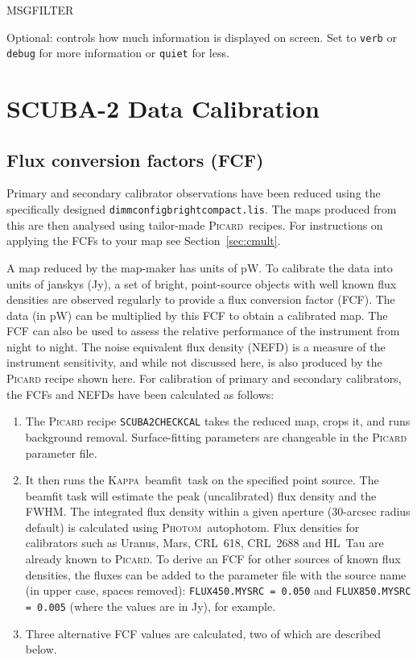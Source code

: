 \documentclass[twoside,11pt]{article}
\newcommand{\htmlref}[2]{#1}
\newcommand{\latexhtml}[2]{#1}
\newcommand{\xref}[3]{#1}
\newcommand{\xlabel}[1]{}
\renewcommand{\_}{\texttt{\symbol{95}}}
\newcommand{\Kappa}{\xref{\textsc{Kappa}}{sun95}{}}
\newcommand{\photom}{\xref{\textsc{Photom}}{sun45}{}}
\newcommand{\picard}{\xref{\textsc{Picard}}{sun265}{}}
\newcommand{\drrecipe}[1]{\texttt{#1}}
\newcommand{\task}[1]{\textsf{#1}}
\newcommand{\beamfit}{\xref{\task{beamfit}}{sun95}{BEAMFIT}}
\newcommand{\autophotom}{\xref{\task{autophotom}}{sun45}{AUTOPHOTOM}}
\newcommand{\cref}[3]{\latexhtml{#1~\ref{#2}}{\htmlref{#3}{#2}}}
\begin{document}
\begin{minipage}[t]{0.2\linewidth}
MSG\_FILTER
\end{minipage}
\begin{minipage}[t]{0.8\linewidth}Optional: controls how much
information is displayed on screen. Set to \texttt{verb} or
\texttt{debug} for more information or \texttt{quiet} for less.
\end{minipage}


\newpage
\section{\xlabel{calib}SCUBA-2 Data Calibration}
\label{app:cal}

\subsection{\xlabel{fcf}Flux conversion factors (FCF)}
\label{app:fcf}

Primary and secondary calibrator observations have been reduced using
the specifically designed \texttt{dimmconfig\_bright\_compact.lis}.
The maps produced from this are then analysed using tailor-made
\picard\ recipes. For instructions on applying the FCFs to your map see
\cref{Section}{sec:cmult}{this page}.

A map reduced by the map-maker has units of pW. To calibrate the data
into units of janskys (Jy), a set of bright, point-source objects with
well known flux densities are observed regularly to provide a flux
conversion factor (FCF). The data (in pW) can be multiplied by this FCF
to obtain a calibrated map. The FCF can also be used to assess the
relative performance of the instrument from night to night. The noise
equivalent flux density (NEFD) is a measure of the instrument
sensitivity, and while not discussed here, is also produced by the
\textsc{Picard} recipe shown here. For calibration of primary and secondary
calibrators, the FCFs and NEFDs have been calculated as follows:

\begin{enumerate}
\item{The \textsc{Picard} recipe \drrecipe{SCUBA2\_CHECK\_CAL} takes the reduced
map, crops it, and runs background removal. Surface-fitting
parameters are changeable in the \textsc{Picard} parameter file.}
\item{It then runs the \Kappa\ \beamfit\ task on the specified point
source. The \task{beamfit} task will estimate the peak (uncalibrated)
flux density and the FWHM. The integrated flux density within a
given aperture (30-arcsec radius default) is calculated using
\photom\ \autophotom. Flux densities for calibrators such as Uranus,
Mars, CRL~618, CRL~2688 and HL~Tau are already known to
\picard. To derive an FCF for other sources of known flux densities,
the fluxes can be added to the parameter file with the source name
(in upper case, spaces removed): \texttt{FLUX\_450.MYSRC = 0.050}
and \texttt{FLUX\_850.MYSRC = 0.005} (where the values are in Jy),
for example.}

\item {Three alternative FCF values are calculated, two of which are
described below.}
\end{enumerate}
\end{document}
